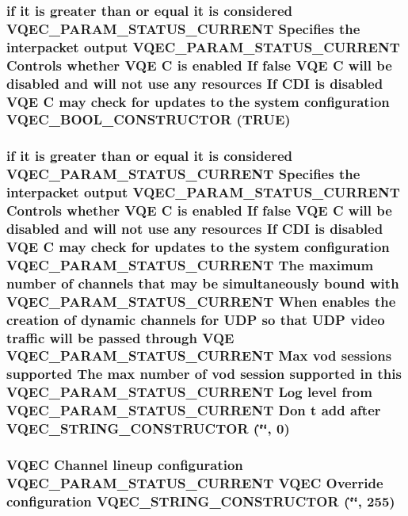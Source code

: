 \subsubsection{\setlength{\rightskip}{0pt plus 5cm}if it is greater than or equal it is considered VQEC\_\-PARAM\_\-STATUS\_\-CURRENT Specifies the interpacket output VQEC\_\-PARAM\_\-STATUS\_\-CURRENT Controls whether VQE \bf{C} is enabled If false VQE \bf{C} will be disabled and will not use any resources If CDI is disabled VQE \bf{C} may check for updates \bf{to} the system configuration VQEC\_\-BOOL\_\-CONSTRUCTOR (\bf{TRUE})}\label{vqec__cfg__settings_8h_7d2cd23db298e1f7619fced6897f126b}


\subsubsection{\setlength{\rightskip}{0pt plus 5cm}if it is greater than or equal it is considered VQEC\_\-PARAM\_\-STATUS\_\-CURRENT Specifies the interpacket output VQEC\_\-PARAM\_\-STATUS\_\-CURRENT Controls whether VQE \bf{C} is enabled If false VQE \bf{C} will be disabled and will not use any resources If CDI is disabled VQE \bf{C} may check for updates \bf{to} the system configuration VQEC\_\-PARAM\_\-STATUS\_\-CURRENT The maximum number of \bf{channels} that may be simultaneously bound with VQEC\_\-PARAM\_\-STATUS\_\-CURRENT When enables the creation of dynamic \bf{channels} for UDP so that UDP video traffic will be passed through VQE VQEC\_\-PARAM\_\-STATUS\_\-CURRENT Max vod sessions supported The max number of vod session supported in \bf{this} VQEC\_\-PARAM\_\-STATUS\_\-CURRENT Log level from VQEC\_\-PARAM\_\-STATUS\_\-CURRENT Don t add after VQEC\_\-STRING\_\-CONSTRUCTOR (\char`\"{}\char`\"{}, 0)}\label{vqec__cfg__settings_8h_3a2a74a1db1e21c9ded79da7aaa95927}


\subsubsection{\setlength{\rightskip}{0pt plus 5cm}VQEC Channel lineup configuration VQEC\_\-PARAM\_\-STATUS\_\-CURRENT VQEC Override configuration VQEC\_\-STRING\_\-CONSTRUCTOR (\char`\"{}\char`\"{}, 255)}\label{vqec__cfg__settings_8h_5a394a40eec2c949acf4310fab04f832}


